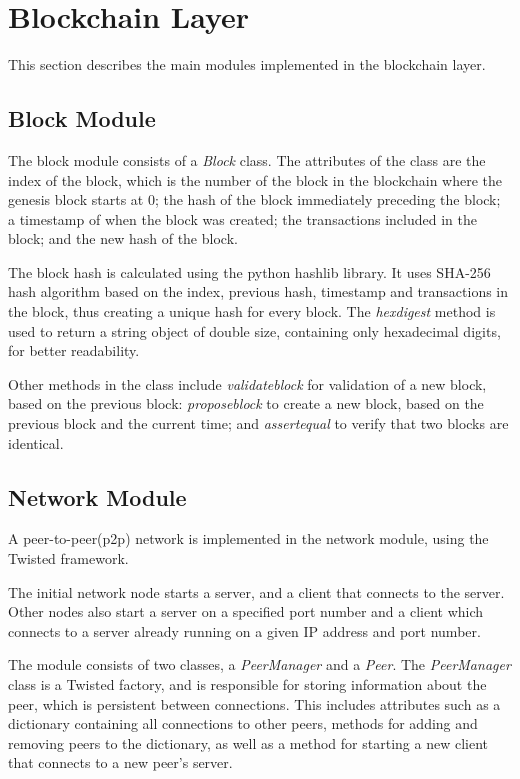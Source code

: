 \section{Blockchain Layer}
This section describes the main modules implemented in the blockchain layer.

\subsection{Block Module}
The block module consists of a \textit{Block} class. The attributes of the class are the index of the block, which is the number of the block in the blockchain where the genesis block starts at 0; the hash of the block immediately preceding the block; a timestamp of when the block was created; the transactions included in the block; and the new hash of the block. 

The block hash is calculated using the python hashlib \cite{hashlib} library. It uses SHA-256 hash algorithm based on the index, previous hash, timestamp and transactions in the block, thus creating a unique hash for every block. The \textit{hexdigest} method is used to return a string object of double size, containing only hexadecimal digits, for better readability. 

Other methods in the class include \textit{validate\textunderscore block} for validation of a new block, based on the previous block: \textit{propose\textunderscore block} to create a new block, based on the previous block and the current time; and \textit{assert\textunderscore equal} to verify that two blocks are identical. 


\subsection{Network Module}
A peer-to-peer(p2p) network is implemented in the network module, using the Twisted \cite{twisted} framework. 

The initial network node starts a server, and a client that connects to the server. Other nodes also start a server on a specified port number and a client which connects to a server already running on a given IP address and port number. 

The module consists of two classes, a \textit{PeerManager} and a \textit{Peer}. The \textit{PeerManager} class is a Twisted factory, and is responsible for storing information about the peer, which is persistent between connections. This includes attributes such as a dictionary containing all connections to other peers, methods for adding and removing peers to the dictionary, as well as a method for starting a new client that connects to a new peer's server.

